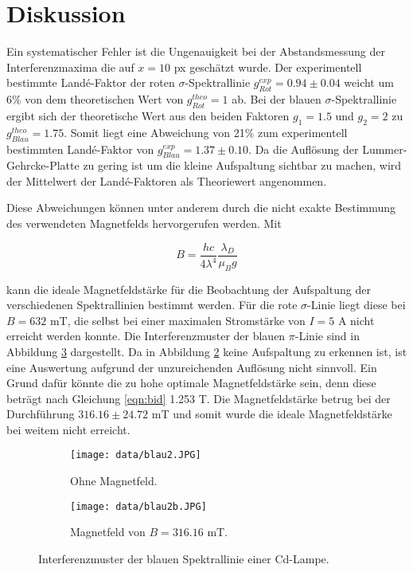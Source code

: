 \section{Diskussion}
\label{sec:Diskussion}
Ein systematischer Fehler ist die Ungenauigkeit bei der Abstandsmessung der Interferenzmaxima die auf $x=10$ px geschätzt wurde.
Der experimentell bestimmte Landé-Faktor der roten $\sigma$-Spektrallinie $g_{Rot}^{exp} = 0.94 \pm 0.04$ weicht um 6\% von dem theoretischen Wert von  $g_{Rot}^{theo} = 1$ ab.
Bei der blauen $\sigma$-Spektrallinie ergibt sich der theoretische Wert aus den beiden Faktoren $g_1=1.5$ und $g_2=2$ zu $g_{Blau}^{theo} = 1.75$.
Somit liegt eine Abweichung von 21\% zum experimentell bestimmten Landé-Faktor von $g_{Blau}^{exp} = 1.37 \pm 0.10$.
Da die Auflösung der Lummer-Gehrcke-Platte zu gering ist um die kleine Aufspaltung sichtbar zu machen, wird der Mittelwert der Landé-Faktoren als Theoriewert angenommen.

\noindent
Diese Abweichungen können unter anderem durch die nicht exakte Bestimmung des verwendeten Magnetfelds hervorgerufen werden.
Mit 

\begin{equation*}
    \label{eqn:bid}
    B=\frac{hc}{4\lambda^4}\frac{\lambda_D}{\mu_B g}
\end{equation*}

\noindent
kann die ideale Magnetfeldstärke für die Beobachtung der Aufspaltung der verschiedenen Spektrallinien bestimmt werden.
Für die rote $\sigma$-Linie liegt diese bei $B=632$ mT, die selbst bei einer maximalen Stromstärke von $I=5$ A nicht erreicht werden konnte.
Die Interferenzmuster der blauen $\pi$-Linie sind in Abbildung \ref{fig:blauu} dargestellt.
Da in Abbildung \ref{fig:blau2b} keine Aufspaltung zu erkennen ist, ist eine Auswertung aufgrund der unzureichenden Auflösung nicht sinnvoll.
Ein Grund dafür könnte die zu hohe optimale Magnetfeldstärke sein, denn diese beträgt nach Gleichung \ref{eqn:bid} 1.253 T.
Die Magnetfeldstärke betrug bei der Durchführung $316.16 \pm 24.72$ mT und somit wurde die ideale Magnetfeldstärke bei weitem nicht erreicht.


\begin{figure}[H]
	\centering
	\begin{subfigure}[b]{0.8\textwidth}
		\centering
		\texttt{[image: data/blau2.JPG]}
		\caption{Ohne Magnetfeld.}
    \label{fig:blau2}
	\end{subfigure}
	
	\begin{subfigure}[b]{0.8\textwidth}
		\centering
		\texttt{[image: data/blau2b.JPG]}
		\caption{Magnetfeld von $B= 316.16$ mT.}
    \label{fig:blau2b}
	\end{subfigure}
    \caption{Interferenzmuster der blauen Spektrallinie einer Cd-Lampe.}
\label{fig:blauu}
\end{figure}


